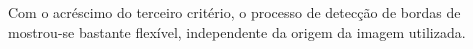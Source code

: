 Com o acréscimo do terceiro critério, o processo de detecção de bordas de 
mostrou-se bastante flexível, independente da origem da imagem utilizada\cite{Vale:2002}.


